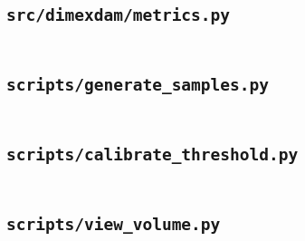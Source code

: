 \documentclass[11pt,a4paper]{article}
\newcommand{\codefile}[1]{\inputminted{python}{#1}}
\newcommand{\code}[1]{\texttt{#1}}
\begin{document}
\subsection{\code{src/dimexdam/metrics.py}}
\codefile{../src/dimexdam/metrics.py}

\subsection{\code{scripts/generate\_samples.py}}
\codefile{../scripts/generate_samples.py}

\subsection{\code{scripts/calibrate\_threshold.py}}
\codefile{../scripts/calibrate_threshold.py}

\subsection{\code{scripts/view\_volume.py}}
\codefile{../scripts/view_volume.py}
\end{document}

